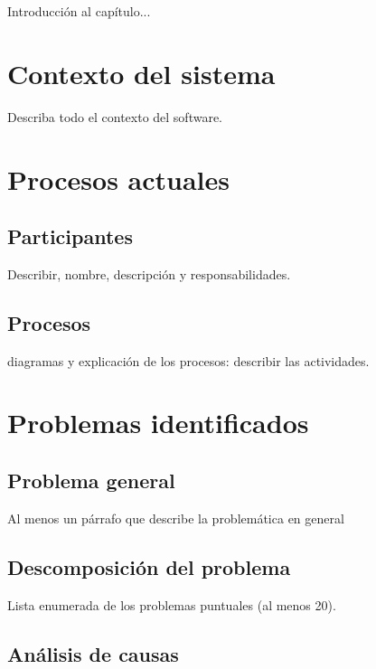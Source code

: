 Introducción al capítulo...

\section{Contexto del sistema}

	Describa todo el contexto del software.

\section{Procesos actuales}

\subsection{Participantes}

Describir, nombre, descripción y responsabilidades.

\subsection{Procesos}

diagramas y explicación de los procesos: describir las actividades.

\section{Problemas identificados}

\subsection{Problema general}

Al menos un párrafo que describe la problemática en general

\subsection{Descomposición del problema}

Lista enumerada de los problemas puntuales (al menos 20).

\subsection{Análisis de causas}


